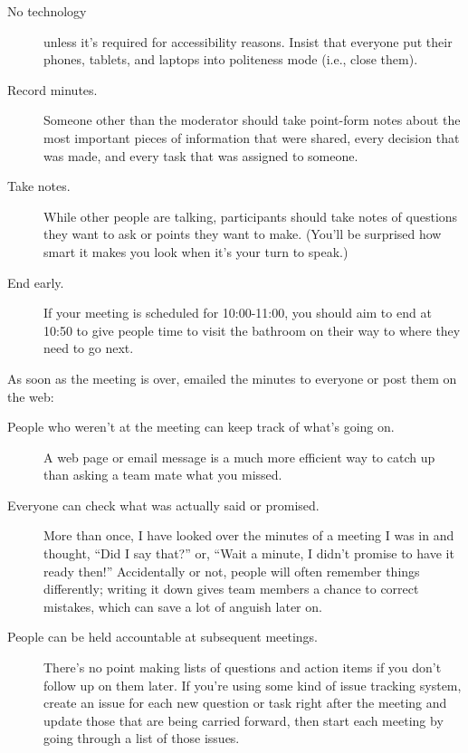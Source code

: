 \begin{description}
\item[No technology]
  unless it's required for accessibility reasons.
  Insist that everyone put their phones, tablets, and laptops into politeness mode
  (i.e., close them).

\item[Record minutes.]
  Someone other than the moderator should take point-form notes about
  the most important pieces of information that were shared,
  every decision that was made,
  and every task that was assigned to someone.

\item[Take notes.]
  While other people are talking,
  participants should take notes of questions they want to ask or points they want to make.
  (You'll be surprised how smart it makes you look when it's your turn to speak.)

\item[End early.]
  If your meeting is scheduled for 10:00-11:00,
  you should aim to end at 10:50 to give people time to visit the bathroom
  on their way to where they need to go next.

\end{description}

As soon as the meeting is over,
emailed the minutes to everyone or post them on the web:

\begin{description}

\item[People who weren't at the meeting can keep track of what's going on.]
  A web page or email message is a much more efficient way to catch up
  than asking a team mate what you missed.

\item[Everyone can check what was actually said or promised.]
  More than once,
  I have looked over the minutes of a meeting I was in
  and thought, ``Did I say that?''
  or, ``Wait a minute, I didn't promise to have it ready then!''
  Accidentally or not,
  people will often remember things differently;
  writing it down gives team members a chance to correct mistakes,
  which can save a lot of anguish later on.

\item[People can be held accountable at subsequent meetings.]
  There's no point making lists of questions and action items
  if you don't follow up on them later.
  If you're using some kind of issue tracking system,
  create an issue for each new question or task right after the meeting
  and update those that are being carried forward,
  then start each meeting by going through a list of those issues.

\end{description}

